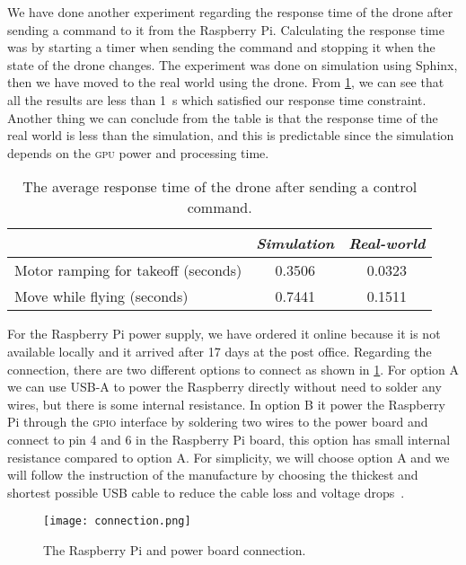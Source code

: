 \documentclass[../main.tex]{subfiles}
\begin{document}
We have done another experiment regarding the response time 
of the drone after sending a command to it from the Raspberry Pi. 
Calculating the response time was by starting a timer when 
sending the command and stopping it when the 
state of the drone changes. 
The experiment was done on simulation using Sphinx,
then we have moved to the real world using the \anafi drone.
From \cref{tab:respone-time}, 
we can see that all the results are less than \SI{1}{\second}
which satisfied our response time constraint.
Another thing we can conclude from the table is that 
the response time of the real world is less than 
the simulation, and this is predictable since the simulation
depends on the \textsc{gpu} power and processing time. 

\begin{table}[tbp]
	\centering
	\caption{The average response time of the drone after sending a control command.}
	\label{tab:respone-time}
        \begin{tabularx}{0.7\textwidth}{ X c c }
		\toprule
		\textit{} & \textit{Simulation} & \textit{Real-world}\\ \midrule
		Motor ramping for takeoff (seconds)  & 0.3506 & 0.0323     \\
		Move while flying (seconds) & 0.7441  & 0.1511   \\
		\bottomrule
	\end{tabularx}
\end{table} 

For the Raspberry Pi power supply, we have ordered it 
online because it is not available locally and 
it arrived after 17 days at the post office.
Regarding the connection, there are 
two different options to connect as shown in \cref{fig:connection}.
For option A we can use USB-A to power the Raspberry directly without
need to solder any wires,
but there is some internal resistance.
In option B it power the Raspberry Pi through the \textsc{gpio} 
interface by soldering two wires to the power board and 
connect to pin 4 and 6 in the Raspberry Pi board,
this option has small internal resistance compared to option A.
For simplicity, we will choose option A and we will 
follow the instruction of the manufacture by choosing 
the thickest and shortest possible USB cable to reduce 
the cable loss and voltage drops~\cite{makerfocus}.

 \begin{figure}[p]
 	\centering
 	\texttt{[image: connection.png]}
 	\caption{The Raspberry Pi and power board connection.}
 	\label{fig:connection}
 \end{figure}   
\end{document}
